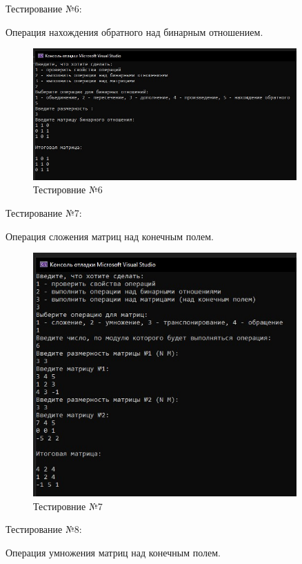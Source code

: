 \documentclass[bachelor, och, labwork]{shiza}
\begin{document}
	Тестирование №6:

Операция нахождения обратного над бинарным отношением.


\begin{figure}[H]
	\centering
	\includegraphics[width=0.9\textwidth]{test_6}
	\caption{Тестировние №6}
	\label{fig:test_6}
\end{figure}

	Тестирование №7:

Операция сложения матриц над конечным полем.


\begin{figure}[H]
	\centering
	\includegraphics[width=0.9\textwidth]{test_7}
	\caption{Тестировние №7}
	\label{fig:test_7}
\end{figure}

	Тестирование №8:

Операция умножения матриц над конечным полем.
\end{document}
